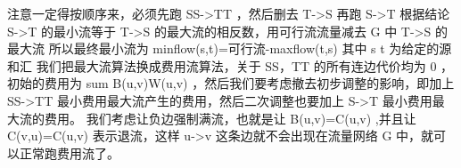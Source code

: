{}注意一定得按顺序来，必须先跑\markdownRendererDollarSign{} SS->TT \markdownRendererDollarSign{}，然后删去\markdownRendererDollarSign{} T->S \markdownRendererDollarSign{}再跑\markdownRendererDollarSign{} S->T \markdownRendererDollarSign{}\markdownRendererInterblockSeparator
{}\markdownRendererInterblockSeparator
{}
\markdownRendererSectionEnd \markdownRendererSectionBegin
{}\markdownRendererInterblockSeparator
{}根据结论 \markdownRendererDollarSign{} S->T \markdownRendererDollarSign{}的最小流等于\markdownRendererDollarSign{} T->S \markdownRendererDollarSign{}的最大流的相反数，用可行流流量减去\markdownRendererDollarSign{} G \markdownRendererDollarSign{}中\markdownRendererDollarSign{} T->S\markdownRendererSoftLineBreak
{}\markdownRendererDollarSign{}的最大流\markdownRendererParagraphSeparator
{}所以最终最小流为\markdownRendererDollarSign{} minflow(s,t)=可行流-maxflow(t,s) \markdownRendererDollarSign{}\markdownRendererParagraphSeparator
{}其中\markdownRendererDollarSign{} s \markdownRendererBackslash{} t \markdownRendererDollarSign{}为给定的源和汇\markdownRendererInterblockSeparator
{}
\markdownRendererSectionEnd \markdownRendererSectionBegin
{}\markdownRendererInterblockSeparator
{}我们把最大流算法换成费用流算法，关于\markdownRendererDollarSign{} SS，TT \markdownRendererDollarSign{}的所有连边代价均为\markdownRendererDollarSign{} 0 \markdownRendererDollarSign{}，初始的费用为\markdownRendererDollarSign{} \markdownRendererBackslash{}sum B(u,v)W(u,v) \markdownRendererDollarSign{}，然后我们要考虑撤去初步调整的影响，即加上\markdownRendererDollarSign{} SS->TT\markdownRendererSoftLineBreak
{}\markdownRendererDollarSign{}最小费用最大流产生的费用，然后二次调整也要加上\markdownRendererDollarSign{} S->T \markdownRendererDollarSign{}最小费用最大流的费用。\markdownRendererInterblockSeparator
{}
\markdownRendererSectionEnd \markdownRendererSectionBegin
{}\markdownRendererInterblockSeparator
{}我们考虑让负边强制满流，也就是让\markdownRendererDollarSign{} B(u,v)=C(u,v) \markdownRendererDollarSign{},并且让\markdownRendererDollarSign{} C(v,u)=C(u,v) \markdownRendererDollarSign{}表示退流，这样\markdownRendererDollarSign{} u->v \markdownRendererDollarSign{}这条边就不会出现在流量网络\markdownRendererDollarSign{} G\markdownRendererSoftLineBreak
{}\markdownRendererDollarSign{}中，就可以正常跑费用流了。\markdownRendererInterblockSeparator
{}\markdownRendererInterblockSeparator
